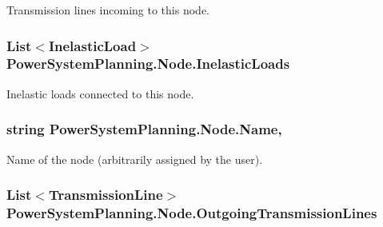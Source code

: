 Transmission lines incoming to this node. 

\subsubsection[{\texorpdfstring{Inelastic\+Loads}{InelasticLoads}}]{\setlength{\rightskip}{0pt plus 5cm}List$<${\bf Inelastic\+Load}$>$ Power\+System\+Planning.\+Node.\+Inelastic\+Loads\hspace{0.3cm}{\ttfamily [get]}}\hypertarget{class_power_system_planning_1_1_node_a242eb347ec0e73927cfcba3ddacc8153}{}\label{class_power_system_planning_1_1_node_a242eb347ec0e73927cfcba3ddacc8153}


Inelastic loads connected to this node. 

\subsubsection[{\texorpdfstring{Name}{Name}}]{\setlength{\rightskip}{0pt plus 5cm}string Power\+System\+Planning.\+Node.\+Name\hspace{0.3cm}{\ttfamily [get]}, {\ttfamily [set]}}\hypertarget{class_power_system_planning_1_1_node_ac793185992fc6c55ca5e1880f4947e57}{}\label{class_power_system_planning_1_1_node_ac793185992fc6c55ca5e1880f4947e57}


Name of the node (arbitrarily assigned by the user). 

\subsubsection[{\texorpdfstring{Outgoing\+Transmission\+Lines}{OutgoingTransmissionLines}}]{\setlength{\rightskip}{0pt plus 5cm}List$<${\bf Transmission\+Line}$>$ Power\+System\+Planning.\+Node.\+Outgoing\+Transmission\+Lines\hspace{0.3cm}{\ttfamily [get]}}\hypertarget{class_power_system_planning_1_1_node_a125dc1d83ad828b71783bd1b2f77687a}{}\label{class_power_system_planning_1_1_node_a125dc1d83ad828b71783bd1b2f77687a}


